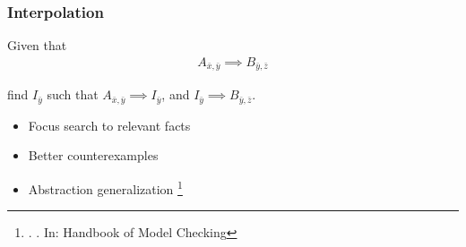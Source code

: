 \documentclass[
    aspectratio=169,
    xcolor={dvipsnames},
]{beamer}
\begin{document}
\begin{frame}
    \frametitle{Interpolation}





    Given that
    \begin{gather*}
        A_{\bar{x}, \bar{y}} \implies B_{\bar{y}, \bar{z}}
    \end{gather*}

    \pause
    find \(I_{\bar{y}}\) such that
    \(A_{\bar{x}, \bar{y}} \implies I_{\bar{y}}\), and
    \(I_{\bar{y}} \implies B_{\bar{y}, \bar{z}}\).

    \pause
    \begin{itemize}
        \item Focus search to relevant facts %
        \item Better counterexamples
        \item Abstraction generalization
        \footnote<3->{
            . . In: Handbook of Model Checking
        }
    \end{itemize}

\end{frame}
\end{document}
